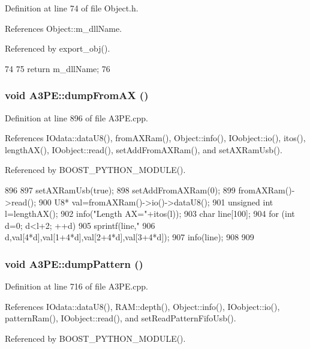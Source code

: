 Definition at line 74 of file Object.h.

References Object::m\_\-dllName.

Referenced by export\_\-obj().


\begin{DoxyCode}
74                        {
75     return m_dllName;
76   }  
\end{DoxyCode}
\hypertarget{classA3PE_a60a510251ec2b5fd800af2ba88e9fdac}{
\subsubsection[{dumpFromAX}]{\setlength{\rightskip}{0pt plus 5cm}void A3PE::dumpFromAX ()}}
\label{classA3PE_a60a510251ec2b5fd800af2ba88e9fdac}


Definition at line 896 of file A3PE.cpp.

References IOdata::dataU8(), fromAXRam(), Object::info(), IOobject::io(), itos(), lengthAX(), IOobject::read(), setAddFromAXRam(), and setAXRamUsb().

Referenced by BOOST\_\-PYTHON\_\-MODULE().


\begin{DoxyCode}
896                      {
897   setAXRamUsb(true);
898   setAddFromAXRam(0);
899   fromAXRam()->read();
900   U8* val=fromAXRam()->io()->dataU8();
901   unsigned int l=lengthAX();
902   info("Length AX="+itos(l));
903   char line[100];
904   for (int d=0; d<l+2; ++d){
905     sprintf(line,"%
906         d,val[4*d],val[1+4*d],val[2+4*d],val[3+4*d]);
907     info(line);
908   }
909 }
\end{DoxyCode}
\hypertarget{classA3PE_a23da04d3c7e632dfb64e5ed4e21a21f3}{
\subsubsection[{dumpPattern}]{\setlength{\rightskip}{0pt plus 5cm}void A3PE::dumpPattern ()}}
\label{classA3PE_a23da04d3c7e632dfb64e5ed4e21a21f3}


Definition at line 716 of file A3PE.cpp.

References IOdata::dataU8(), RAM::depth(), Object::info(), IOobject::io(), patternRam(), IOobject::read(), and setReadPatternFifoUsb().

Referenced by BOOST\_\-PYTHON\_\-MODULE().


